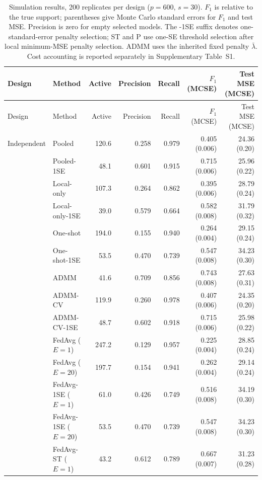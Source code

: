 \begingroup\footnotesize\setlength{\tabcolsep}{3pt}\renewcommand{\arraystretch}{0.93}
\begin{longtable}{llrrrrr}
\caption{Simulation results, 200 replicates per design ($p=600$, $s=30$). $F_1$ is relative to the true support; parentheses give Monte Carlo standard errors for $F_1$ and test MSE. Precision is zero for empty selected models. The -1SE suffix denotes one-standard-error penalty selection; ST and P use one-SE threshold selection after local minimum-MSE penalty selection. ADMM uses the inherited fixed penalty $\bar\lambda$. Cost accounting is reported separately in Supplementary Table~S1.}\label{tab:main}\\
\toprule
Design & Method & Active & Precision & Recall & $F_1$ (MCSE) & Test MSE (MCSE) \\
\midrule
\endfirsthead
\toprule
Design & Method & Active & Precision & Recall & $F_1$ (MCSE) & Test MSE (MCSE) \\
\midrule
\endhead
\bottomrule
\endfoot
Independent & Pooled & 120.6 & 0.258 & 0.979 & 0.405 (0.006) & 24.36 (0.20) \\
 & Pooled-1SE & 48.1 & 0.601 & 0.915 & 0.715 (0.006) & 25.96 (0.22) \\
 & Local-only & 107.3 & 0.264 & 0.862 & 0.395 (0.006) & 28.79 (0.24) \\
 & Local-only-1SE & 39.0 & 0.579 & 0.664 & 0.582 (0.008) & 31.79 (0.32) \\
 & One-shot & 194.0 & 0.155 & 0.940 & 0.264 (0.004) & 29.15 (0.24) \\
 & One-shot-1SE & 53.5 & 0.470 & 0.739 & 0.547 (0.008) & 34.23 (0.30) \\
 & ADMM & 41.6 & 0.709 & 0.856 & 0.743 (0.008) & 27.63 (0.31) \\
 & ADMM-CV & 119.9 & 0.260 & 0.978 & 0.407 (0.006) & 24.35 (0.20) \\
 & ADMM-CV-1SE & 48.7 & 0.602 & 0.918 & 0.715 (0.006) & 25.98 (0.22) \\
 & FedAvg ($E=1$) & 247.2 & 0.129 & 0.957 & 0.225 (0.004) & 28.85 (0.24) \\
 & FedAvg ($E=20$) & 197.7 & 0.154 & 0.941 & 0.262 (0.004) & 29.14 (0.24) \\
 & FedAvg-1SE ($E=1$) & 61.0 & 0.426 & 0.749 & 0.516 (0.008) & 34.19 (0.30) \\
 & FedAvg-1SE ($E=20$) & 53.5 & 0.470 & 0.739 & 0.547 (0.008) & 34.23 (0.30) \\
 & FedAvg-ST ($E=1$) & 43.2 & 0.612 & 0.789 & 0.667 (0.007) & 31.23 (0.28) \\

\end{longtable}
